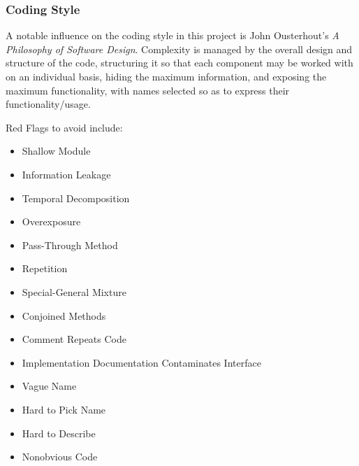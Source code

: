 \documentclass{ltxdoc}
\begin{document}
\subsubsection{Coding Style}

A notable influence on the coding style in this project is John Ousterhout's \emph{A Philosophy of Software Design}\cite{Ousterhout2018APO}. Complexity is managed by the overall design and structure of the code, structuring it so that each component may be worked with on an individual basis, hiding the maximum information, and exposing the maximum functionality, with names selected so as to express their functionality/usage.

Red Flags to avoid include:

\begin{itemize}
\item Shallow Module
\item Information Leakage
\item Temporal Decomposition 
\item Overexposure
\item Pass-Through Method
\item Repetition
\item Special-General Mixture
\item Conjoined Methods
\item Comment Repeats Code
\item Implementation Documentation Contaminates Interface
\item Vague Name
\item Hard to Pick Name
\item Hard to Describe
\item Nonobvious Code
\end{itemize}
\end{document}
